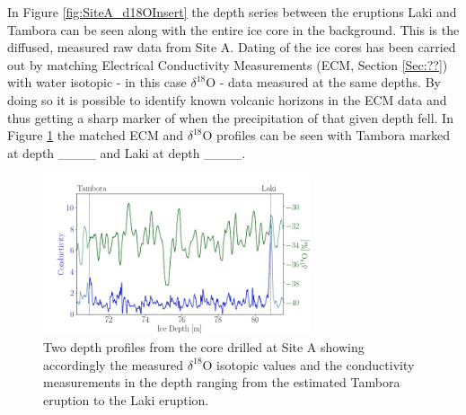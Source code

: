 \documentclass[../../CompleteThesis/Complete_1stDraft.tex]{subfiles}
\begin{document}
In Figure \ref{fig:SiteA_d18OInsert} the depth series between the eruptions Laki and Tambora can be seen along with the entire ice core in the background. This is the diffused, measured raw data from Site A. Dating of the ice cores has been carried out by matching Electrical Conductivity Measurements (ECM, Section \ref{Sec:??}) with water isotopic - in this case $\delta^{18}$O - data measured at the same depths. By doing so it is possible to identify known volcanic horizons in the ECM data and thus getting a sharp marker of when the precipitation of that given depth fell. In Figure \ref{fig:SiteA_ECMd18O_combo} the matched ECM and $\delta^{18}$O profiles can be seen with Tambora marked at depth \_\_\_\_ and Laki at depth \_\_\_\_.

\begin{figure}[h]
	\centering
	\includegraphics[width=0.7\textwidth]{SiteA_ECMd18O_combo.jpg}
	\caption[ECM and d18O data at LT, Site A.]{Two depth profiles from the core drilled at Site A showing accordingly the measured $\delta^{18}$O isotopic values and the conductivity measurements in the depth ranging from the estimated Tambora eruption to the Laki eruption.}	
	\label{fig:SiteA_ECMd18O_combo}
\end{figure}
\end{document}

